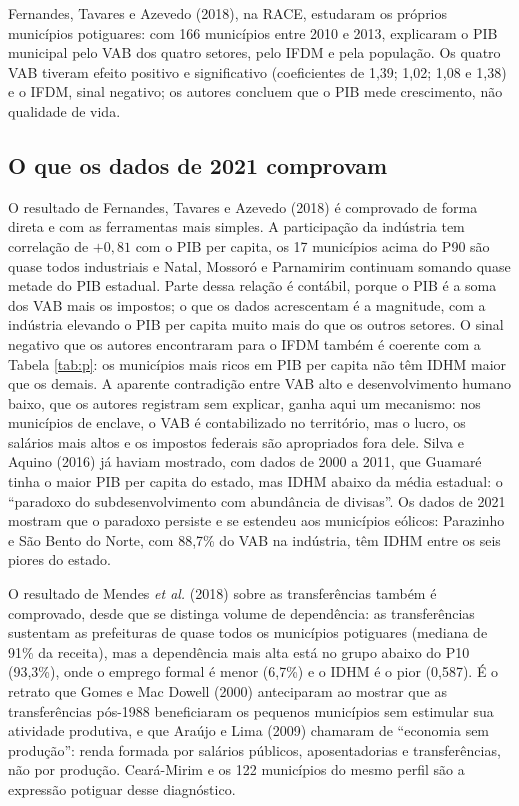 \documentclass[12pt,a4paper]{article}
\begin{document}
Fernandes, Tavares e Azevedo (2018), na RACE, estudaram os próprios municípios potiguares: com 166 municípios entre 2010 e 2013, explicaram o PIB municipal pelo VAB dos quatro setores, pelo IFDM e pela população. Os quatro VAB tiveram efeito positivo e significativo (coeficientes de 1,39; 1,02; 1,08 e 1,38) e o IFDM, sinal negativo; os autores concluem que o PIB mede crescimento, não qualidade de vida.

\subsection{O que os dados de 2021 comprovam}

O resultado de Fernandes, Tavares e Azevedo (2018) é comprovado de forma direta e com as ferramentas mais simples. A participação da indústria tem correlação de $+0{,}81$ com o PIB per capita, os 17 municípios acima do P90 são quase todos industriais e Natal, Mossoró e Parnamirim continuam somando quase metade do PIB estadual. Parte dessa relação é contábil, porque o PIB é a soma dos VAB mais os impostos; o que os dados acrescentam é a magnitude, com a indústria elevando o PIB per capita muito mais do que os outros setores. O sinal negativo que os autores encontraram para o IFDM também é coerente com a Tabela \ref{tab:p}: os municípios mais ricos em PIB per capita não têm IDHM maior que os demais. A aparente contradição entre VAB alto e desenvolvimento humano baixo, que os autores registram sem explicar, ganha aqui um mecanismo: nos municípios de enclave, o VAB é contabilizado no território, mas o lucro, os salários mais altos e os impostos federais são apropriados fora dele. Silva e Aquino (2016) já haviam mostrado, com dados de 2000 a 2011, que Guamaré tinha o maior PIB per capita do estado, mas IDHM abaixo da média estadual: o ``paradoxo do subdesenvolvimento com abundância de divisas''. Os dados de 2021 mostram que o paradoxo persiste e se estendeu aos municípios eólicos: Parazinho e São Bento do Norte, com 88,7\% do VAB na indústria, têm IDHM entre os seis piores do estado.

O resultado de Mendes \textit{et al.} (2018) sobre as transferências também é comprovado, desde que se distinga volume de dependência: as transferências sustentam as prefeituras de quase todos os municípios potiguares (mediana de 91\% da receita), mas a dependência mais alta está no grupo abaixo do P10 (93,3\%), onde o emprego formal é menor (6,7\%) e o IDHM é o pior (0,587). É o retrato que Gomes e Mac Dowell (2000) anteciparam ao mostrar que as transferências pós-1988 beneficiaram os pequenos municípios sem estimular sua atividade produtiva, e que Araújo e Lima (2009) chamaram de ``economia sem produção'': renda formada por salários públicos, aposentadorias e transferências, não por produção. Ceará-Mirim e os 122 municípios do mesmo perfil são a expressão potiguar desse diagnóstico.
\end{document}
